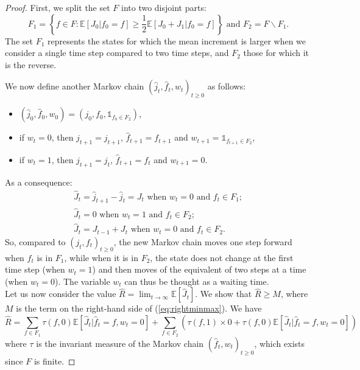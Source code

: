 \documentclass[10pt,a4paper]{amsart}
\newcommand{\esp}[1]{\mathbb{E}\left[ #1 \right]}
\newcommand{\ind}{\mathbb{1}}
\begin{document}
\begin{proof}
First, we split the set $F$ into two disjoint parts:
\begin{displaymath}
 F_1 = \left\{f \in F : \esp{J_0 | f_0 = f} \geq \frac{1}{2} \esp{J_0+J_1 | f_0 = f} \right\} \text{ and } F_2 = F \backslash F_1.  
\end{displaymath}
The set $F_1$ represents the states for which the mean increment is larger when we consider a single time step compared to two time steps, and $F_2$ those for which it is the reverse.

We now define another Markov chain $(\hat{j}_t,\hat{f}_t,w_t)_{t\geq0}$ as follows:
\begin{itemize}[label=$\bullet$]
    \item $(\hat{j}_0,\hat{f}_0,w_0) = (j_0,f_0,\ind_{f_0 \in F_2})$,
    \item if $w_t = 0$, then $\hat{j}_{t+1} = j_{t+1}$, $\hat{f}_{t+1} = f_{t+1}$ and $w_{t+1} = \ind_{f_{t+1} \in F_2}$,
    \item if $w_{t} =1$, then  $\hat{j}_{t+1} = j_{t}$, $\hat{f}_{t+1} = f_t$ and $w_{t+1} = 0$.
\end{itemize}

As a consequence:
\begin{align*}
    \hat{J}_t = \hat{j}_{t+1} - \hat{j}_t = J_t \text{ when } w_t=0 \text{ and } f_t\in F_1;\\
    \hat{J}_t = 0 \text{ when } w_t=1 \text{ and } f_t\in F_2;\\
    \hat{J}_t = J_{t-1} + J_t \text{ when } w_t=0 \text{ and } f_t\in F_2.
\end{align*}
So, compared to $(j_t,f_t)_{t\geq 0}$, the new Markov chain moves one step forward when $\hat{f}_t$ is in $F_1$, while when it is in $F_2$, the state does not change at the first time step (when $w_t=1$) and then moves of the equivalent of two steps at a time (when $w_t=0$). The variable $w_t$ can thus be thought as a waiting time. \\

Let us now consider the value $\hat{R} = \lim_{t\to\infty} \esp{\hat{J}_t}$.
We show that $\hat{R}\geq M$, where $M$ is the term on the right-hand side of (\ref{eq:rightminmax}).
We have 
\begin{displaymath}
    \hat{R} = \sum_{f \in F_1} \tau(f,0) \esp{\hat{J}_t | \hat{f}_t = f, w_t=0} + \sum_{f \in F_2}  \left( \tau(f,1) \times 0 + \tau(f,0) \esp{\hat{J}_t | \hat{f}_t = f, w_t=0}\right)
\end{displaymath}
where $\tau$ is the invariant measure of the Markov chain $(\hat{f}_t,w_t)_{t\geq 0}$, which exists since $F$ is finite.


\end{proof}
\end{document}
